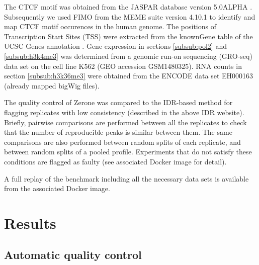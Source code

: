 \documentclass{bioinfo}
\begin{document}
\begin{methods}
The CTCF motif was obtained from the JASPAR database version
5.0{\textunderscore}ALPHA \citep[motif ID MA0139.1,][]{pmid24194598}.
Subsequently we used FIMO \citep{pmid21330290} from the MEME suite version
4.10.1 \citep{pmid19458158} to identify and map CTCF motif occurences in
the human genome. The positions of Transcription Start Sites (TSS)
were extracted from the knownGene
table of the UCSC Genes annotation \citep{Karolchik2004}.
Gene expression in sections \ref{subsub:pol2} and \ref{subsub:h3k4me3}
was determined from a genomic run-on sequencing (GRO-seq)
data set on the cell line K562 (GEO accession GSM1480325).
RNA counts in section \ref{subsub:h3k36me3} were obtained from the
ENCODE data set EH000163 (already mapped bigWig files).

The quality control of Zerone was compared to the IDR-based method
for flagging replicates with low consistency
(described in the above IDR website). Briefly, pairwise
comparisons are performed between all the replicates to check that
the number of reproducible peaks is similar between them. The
same comparisons are also performed between random splits of each
replicate, and between random splits of a pooled profile. Experiments
that do not satisfy these conditions are flagged as faulty (see
associated Docker image for detail).

A full replay of the benchmark including all the necessary data sets
is available from the associated Docker image.

\end{methods}

\section{Results}
\label{sec:results}

\subsection{Automatic quality control}
\end{document}
